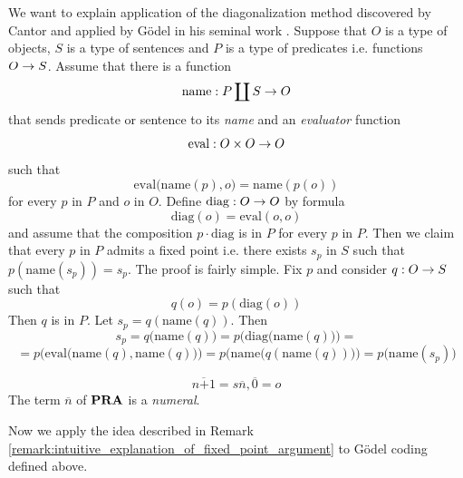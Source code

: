 \documentclass[10pt]{amsart}
\newcommand{\meq}{\boldsymbol{=}}
\newcommand{\mplus}{\boldsymbol{+}}
\begin{document}
\begin{remark}\label{remark:intuitive_explanation_of_fixed_point_argument}
	We want to explain application of the diagonalization method discovered by Cantor and applied by G{\"o}del in his seminal work \cite{godel1931formal}. Suppose that $O$ is a type of objects, $S$ is a type of sentences and $P$ is a type of predicates i.e. functions $O \rightarrow S$. Assume that there is a function
	$$\mathrm{name}:P \coprod S \rightarrow O$$
	that sends predicate or sentence to its \textit{name} and an \textit{evaluator} function
	$$\mathrm{eval}:O \times O \rightarrow O$$
	such that
	$$\mathrm{eval}\big(\mathrm{name}(p),o\big) \meq \mathrm{name}(p(o))$$
	for every $p$ in $P$ and $o$ in $O$. Define $\mathrm{diag}:O \rightarrow O$ by formula
	$$\mathrm{diag}(o) \meq \mathrm{eval}(o, o)$$
	and assume that the composition $p\cdot \mathrm{diag}$ is in $P$ for every $p$ in $P$. Then we claim that every $p$ in $P$ admits a fixed point i.e. there exists $s_p$ in $S$ such that $p\left(\mathrm{name}(s_p)\right) \meq s_p$. The proof is fairly simple. Fix $p$ and consider $q:O \rightarrow S$ such that
	$$q(o) \meq p\left(\mathrm{diag}(o)\right)$$
	Then $q$ is in $P$. Let $s_p \meq q\left(\mathrm{name}(q)\right)$. Then
	$$s_p \meq q\big(\mathrm{name}(q)\big) \meq p\bigg(\mathrm{diag}\big(\mathrm{name}(q)\big)\bigg) \meq$$
	$$\meq p\bigg(\mathrm{eval}\big(\mathrm{name}(q),\mathrm{name}(q)\big)\bigg) \meq p\bigg(\mathrm{name}\big(q(\mathrm{name}(q))\big)\bigg) \meq p\big(\mathrm{name}(s_p)\big)$$
\end{remark}

\begin{definition}
	$$\overline{n \mplus 1} \meq s\overline{n},\overline{0} \meq o$$
	The term $\overline{n}$ of $\mathbf{PRA}$ is a \textit{numeral}.
\end{definition}
\noindent
Now we apply the idea described in Remark \ref{remark:intuitive_explanation_of_fixed_point_argument} to G{\"o}del coding defined above.
\end{document}
